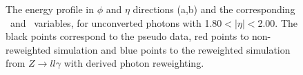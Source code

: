 \begin{figure}[htbp]
	\begin{tcolorbox}[colback=black!5!white,colframe=white!75!black]
    \caption{The energy profile in $\phi$ and $\eta$ directions (a,b) and the corresponding \Rphi \ and \Reta \ variables, for unconverted photons with 1.80$<|\eta|<$2.00. The black points correspond to the pseudo data, red points to non-reweighted simulation and blue points to the reweighted simulation from $Z\rightarrow ll\gamma$ with derived photon reweighting.}
    \label{Photon:2}
    \end{tcolorbox}
    
\end{figure}

\begin{figure}[htbp]
    \centering
	 \\

\end{figure}

